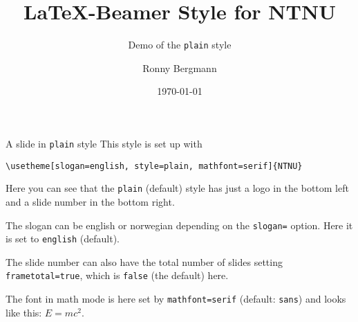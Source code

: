 \documentclass[aspectratio=169]{beamer}
\title{\LaTeX{}-Beamer Style for NTNU}
\subtitle{Demo of the  \texttt{plain} style}
\author{Ronny Bergmann}
\date{\today}
\begin{document}
	\maketitle
    \begin{frame}[fragile]{A slide in \texttt{plain} style}
        This style is set up with

        \lstinline!\usetheme[slogan=english, style=plain, mathfont=serif]{NTNU}!

        Here you can see that the \texttt{plain} (default) style has just a logo in the bottom left and a slide number in the bottom right.

        The slogan can be english or norwegian depending on the \lstinline!slogan=! option. Here it is set to \lstinline!english! (default).

        The slide number can also have the total number of slides setting \lstinline!frametotal=true!, which is \lstinline!false! (the default) here.
        
        The font in math mode is here set by \lstinline!mathfont=serif! (default: \lstinline!sans!) and looks like this: $E=mc^2$.
    \end{frame}
\end{document}
